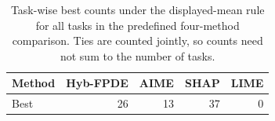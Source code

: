 \begin{table}[!tbp]
    \caption{Task-wise best counts under the displayed-mean rule for all tasks in the predefined four-method comparison. Ties are counted jointly, so counts need not sum to the number of tasks.}
    \label{tab:taskwise_winner_counts}
    \centering
    \begin{tabular}{lrrrr}
        \toprule
        Method & Hyb-FPDE & AIME & SHAP & LIME  \\
        \midrule
        Best & 26 & 13 & 37 & 0 \\
        \bottomrule
    \end{tabular}
\end{table}
